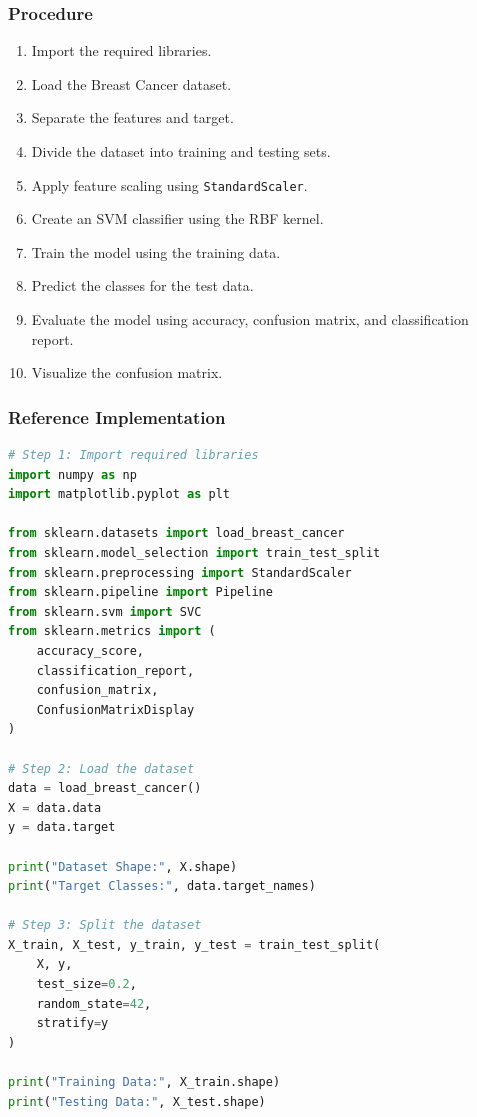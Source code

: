 \documentclass[a4paper,11pt]{article}
\begin{document}
\begin{itemize}
\subsubsection{Procedure}
\begin{enumerate}
    \item Import the required libraries.
    \item Load the Breast Cancer dataset.
    \item Separate the features and target.
    \item Divide the dataset into training and testing sets.
    \item Apply feature scaling using \texttt{StandardScaler}.
    \item Create an SVM classifier using the RBF kernel.
    \item Train the model using the training data.
    \item Predict the classes for the test data.
    \item Evaluate the model using accuracy, confusion matrix, and classification report.
    \item Visualize the confusion matrix.
\end{enumerate}

\subsubsection{Reference Implementation}
\begin{lstlisting}[language=Python, caption={SVM Implementation}]
# Step 1: Import required libraries
import numpy as np
import matplotlib.pyplot as plt

from sklearn.datasets import load_breast_cancer
from sklearn.model_selection import train_test_split
from sklearn.preprocessing import StandardScaler
from sklearn.pipeline import Pipeline
from sklearn.svm import SVC
from sklearn.metrics import (
    accuracy_score,
    classification_report,
    confusion_matrix,
    ConfusionMatrixDisplay
)

# Step 2: Load the dataset
data = load_breast_cancer()
X = data.data
y = data.target

print("Dataset Shape:", X.shape)
print("Target Classes:", data.target_names)

# Step 3: Split the dataset
X_train, X_test, y_train, y_test = train_test_split(
    X, y,
    test_size=0.2,
    random_state=42,
    stratify=y
)

print("Training Data:", X_train.shape)
print("Testing Data:", X_test.shape)


\end{lstlisting}
\end{itemize}
\end{document}
